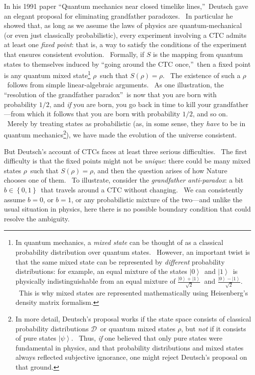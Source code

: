 \documentclass[12pt,onecolumn]{article}%
\begin{document}
In his 1991 paper \textquotedblleft Quantum mechanics near closed timelike
lines,\textquotedblright\ Deutsch \cite{deutsch:ctc} gave an elegant proposal
for eliminating grandfather paradoxes. \ In particular he showed that, as long
as we assume the laws of physics are quantum-mechanical (or even just
classically probabilistic), every experiment involving a CTC admits at least
one \textit{fixed point}: that is, a way to satisfy the conditions of the
experiment that ensures consistent evolution. \ Formally, if $S$ is the
mapping from quantum states to themselves induced by \textquotedblleft going
around the CTC once,\textquotedblright\ then a fixed point is any quantum
mixed state\footnote{In quantum mechanics, a \textit{mixed state} can be
thought of as a classical probability distribution over quantum states.
\ However, an important twist is that the same mixed state can be represented
by \textit{different} probability distributions: for example, an equal mixture
of the states $\left\vert 0\right\rangle $\ and $\left\vert 1\right\rangle
$\ is physically indistinguishable from an equal mixture of $\frac{\left\vert
0\right\rangle +\left\vert 1\right\rangle }{\sqrt{2}}$\ and $\frac{\left\vert
0\right\rangle -\left\vert 1\right\rangle }{\sqrt{2}}$. \ This is why mixed
states are represented mathematically using Heisenberg's density matrix
formalism.} $\rho$\ such that $S\left(  \rho\right)  =\rho$. \ The existence
of such a $\rho$\ follows from simple linear-algebraic arguments. \ As one
illustration, the \textquotedblleft resolution of the grandfather
paradox\textquotedblright\ is now that you are born with probability $1/2$,
and \textit{if} you are born, you go back in time to kill your
grandfather---from which it follows that you are born with probability $1/2$,
and so on. \ Merely by treating states as probabilistic (as, in some sense,
they \textit{have} to be in quantum mechanics\footnote{In more detail,
Deutsch's proposal works if the state space consists of classical probability
distributions $\mathcal{D}$\ or quantum mixed states $\rho$, but \textit{not}
if it consists of pure states $\left\vert \psi\right\rangle $. \ Thus,
\textit{if} one believed that only pure states were fundamental in physics,
and that probability distributions and mixed states always reflected
subjective ignorance, one might reject Deutsch's proposal on that ground.}),
we have made the evolution of the universe consistent.

But Deutsch's account of CTCs faces at least three serious difficulties. \ The
first difficulty is that the fixed points might not be \textit{unique}: there
could be many mixed states $\rho$\ such that $S\left(  \rho\right)  =\rho$,
and then the question arises of how Nature chooses one of them. \ To
illustrate, consider the \textit{grandfather anti-paradox}: a bit
$b\in\left\{  0,1\right\}  $\ that travels around a CTC without changing. \ We
can consistently assume $b=0$, or $b=1$, or any probabilistic mixture of the
two---and unlike the usual situation in physics, here there is no possible
boundary condition that could resolve the ambiguity.
\end{document}
